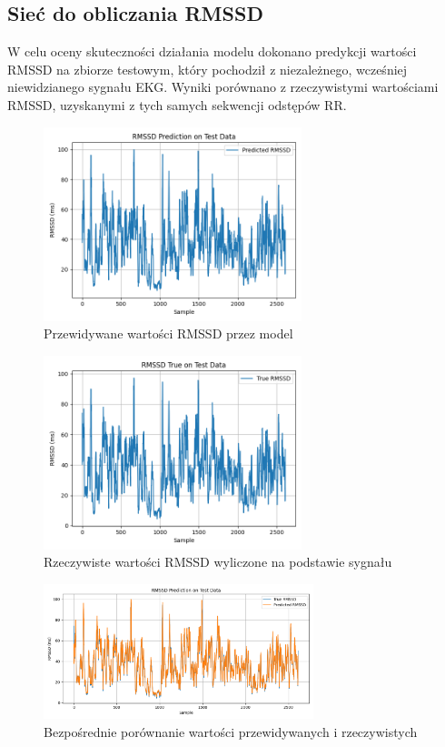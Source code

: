 \documentclass{article}
\begin{document}
\subsection{Sieć do obliczania RMSSD}
W celu oceny skuteczności działania modelu dokonano predykcji wartości RMSSD na zbiorze testowym, który pochodził z niezależnego, wcześniej niewidzianego sygnału EKG. Wyniki porównano z rzeczywistymi wartościami RMSSD, uzyskanymi z tych samych sekwencji odstępów RR.
\begin{figure}[h]
    \centering
    \includegraphics[width=0.67\textwidth]{rmsd_prediction.png}
    \caption{Przewidywane wartości RMSSD przez model}
\end{figure}
\begin{figure}[h]
    \centering
    \includegraphics[width=0.67\textwidth]{rmsd_true.png}
    \caption{Rzeczywiste wartości RMSSD wyliczone na podstawie sygnału}
\end{figure}
\newpage
\begin{figure}[h]
    \centering
    \includegraphics[width=0.7\textwidth]{rmssd_combinded.png}
    \caption{ Bezpośrednie porównanie wartości przewidywanych i rzeczywistych}
\end{figure}
\end{document}
